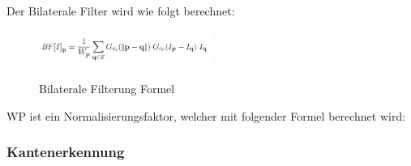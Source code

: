     Der Bilaterale Filter wird wie folgt berechnet:
    \begin{figure}[H]
        \centering
        \includegraphics[width=0.5\textwidth]{pics/Bilateral-Filtering-in-Python-OpenCV.jpeg}
        \caption{Bilaterale Filterung Formel}
        \cite{BilateralFormula1}
        \label{fig:anpr:bilat:1}
        \end{figure}
WP ist ein Normalisierungsfaktor, welcher mit folgender Formel berechnet wird:

\subsubsection{Kantenerkennung}
\cite{Filter}